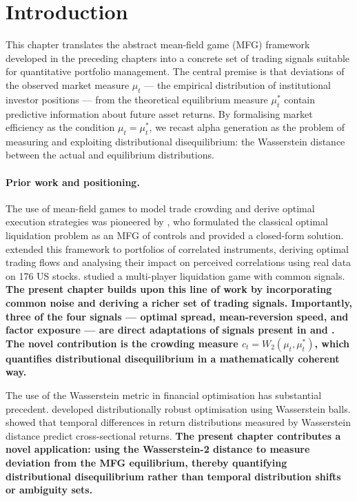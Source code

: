 
\section{Introduction}

This chapter translates the abstract mean-field game (MFG) framework developed in
the preceding chapters into a concrete set of trading signals suitable for
quantitative portfolio management. The central premise is that deviations of the
observed market measure $\mu_t$ --- the empirical distribution of institutional
investor positions --- from the theoretical equilibrium measure $\mu_t^*$ contain
predictive information about future asset returns. By formalising market efficiency
as the condition $\mu_t = \mu_t^*$, we recast alpha generation as the problem of
measuring and exploiting distributional disequilibrium: the Wasserstein distance
between the actual and equilibrium distributions.

\paragraph{Prior work and positioning.} The use of mean-field games to model trade
crowding and derive optimal execution strategies was pioneered by \citep{cardaliaguetlehalle2018}, who formulated the classical optimal liquidation problem as an MFG of
controls and provided a closed-form solution. \citep{lehallemouzouni2019} extended
this framework to portfolios of correlated instruments, deriving optimal trading
flows and analysing their impact on perceived correlations using real data on 176 US
stocks. \citep{neumanvoss2023} studied a multi-player liquidation game with common
signals. \textbf{The present chapter builds upon this line of work by incorporating
common noise and deriving a richer set of trading signals. Importantly, three of the
four signals --- optimal spread, mean-reversion speed, and factor exposure --- are
direct adaptations of signals present in \citep{cardaliaguetlehalle2018} and \citep{lehallemouzouni2019}. The novel contribution is the crowding measure
$c_t = W_2(\mu_t, \mu_t^*)$, which quantifies distributional disequilibrium in a
mathematically coherent way.}

The use of the Wasserstein metric in financial optimisation has substantial
precedent. \citep{esfahanikuhn2018} developed distributionally robust optimisation
using Wasserstein balls. \citep{kimkorajczykneuhierl2015} showed that temporal
differences in return distributions measured by Wasserstein distance predict
cross-sectional returns. \textbf{The present chapter contributes a novel
application: using the Wasserstein-2 distance to measure deviation from the MFG
equilibrium, thereby quantifying distributional disequilibrium rather than temporal
distribution shifts or ambiguity sets.}

